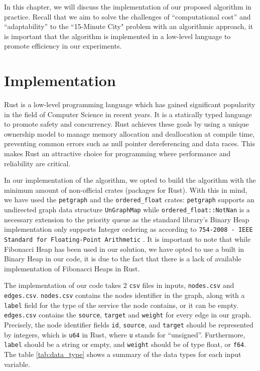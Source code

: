 In this chapter, we will discuss the implementation of our proposed algorithm in practice. Recall that we aim to solve the challenges of ``computational cost'' and ``adaptability'' \cite{lima_quest_2023} to the ``15-Minute City" problem with an algorithmic approach, it is important that the algorithm is implemented in a low-level language to promote efficiency in our experiments.

\section{Implementation}

Rust is a low-level programming language which has gained significant popularity in the field of Computer Science in recent years. It is a statically typed language to promote safety and concurrency. Rust achieves these goals by using a unique ownership model to manage memory allocation and deallocation at compile time, preventing common errors such as null pointer dereferencing and data races. This makes Rust an attractive choice for programming where performance and reliability are critical.

In our implementation of the algorithm, we opted to build the algorithm with the minimum amount of non-official crates (packages for Rust). With this in mind, we have used the \verb|petgraph| and the \verb|ordered_float| crates: \verb|petgraph| \cite{petgraph} supports an undirected graph data structure \verb|UnGraphMap| while \verb|ordered_float::NotNan| \cite{ordered_float} is a necessary extension to the priority queue as the standard library's Binary Heap implementation only supports Integer ordering as according to \verb|754-2008 - IEEE Standard for Floating-Point Arithmetic| \cite{IEEE}. It is important to note that while Fibonacci Heap has been used in our solution, we have opted to use a built in Binary Heap in our code, it is due to the fact that there is a lack of available implementation of Fibonacci Heaps in Rust.

The implementation of our code takes 2 \verb|csv| files in inputs, \verb|nodes.csv| and \verb|edges.csv|. \verb|nodes.csv| contains the nodes identifier in the graph, along with a \verb|label| field for the type of the service the node contains, or it can be empty. \verb|edges.csv| contains the \verb|source|, \verb|target| and \verb|weight| for every edge in our graph. Precisely, the node identifier fields \verb|id|, \verb|source|, and \verb|target| should be represented by integers, which is \verb|u64| in Rust, where \verb|u| stands for ``unsigned''. Furthermore, \verb|label| should be a string or empty, and \verb|weight| should be of type float, or \verb|f64|. The table \ref{tab:data_type} shows a summary of the data types for each input variable.

